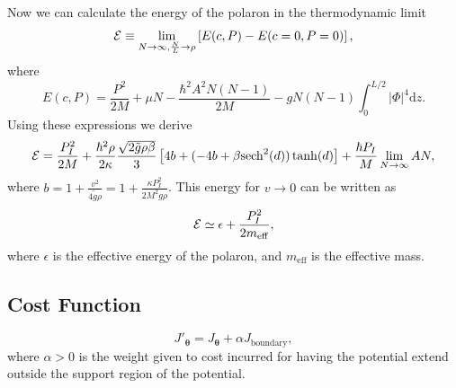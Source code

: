 \documentclass[twocolumn,amsmath,amssymb,showpacs,prl,superscriptaddress,aps]{revtex4-1}
\begin{document}
Now we can calculate the energy of the polaron in the thermodynamic limit
\begin{equation}
{\cal E}\equiv \lim_{N\to\infty, \frac{N}{L}\to \rho}\left[E(c,P)-E(c=0,P=0)\right],
\end{equation}
where
\begin{equation}
E(c,P) = \frac{P^2}{2M} + \mu N-\frac{\hbar^2 A^2 N(N-1)}{2M}-gN(N-1)\int_{0}^{L/2}|\Phi|^4\mathrm{d}z.
\end{equation}
Using these expressions we derive 
\begin{equation}
{\cal E}=\frac{P_I^2}{2M}+\frac{\hbar^2\rho}{2\kappa}\frac{\sqrt{2 \tilde g \rho \beta}}{3}\left[4 b + (-4b+\beta\mathrm{sech}^2(d))\tanh(d)\right]+\frac{\hbar P_I}{M}\lim_{N\to\infty} A N,
\end{equation}
where $b=1+\frac{v^2}{4\tilde g\rho}=1+\frac{\kappa P_I^2}{2M^2 g\rho}$. This energy for $v\to 0$ can be written as 
\begin{equation}
{\cal E}\simeq \epsilon+ \frac{P_I^2}{2m_{\mathrm{\mathrm{eff}}}},
\end{equation}
where $\epsilon$ is the effective energy of the polaron, and $m_{\mathrm{eff}}$ is the effective mass.





\subsection{Cost Function}\label{sec:cost_function}

\begin{equation}
  J'_{\mathbf{\theta}} = J_{\mathbf{\theta}} + \alpha J_{\mathrm{boundary}},
\end{equation}
where $\alpha>0$ is the weight given to cost incurred for having the potential extend outside the support region of the potential.






 
\end{document}
